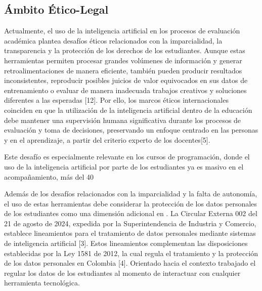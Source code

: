 \documentclass[letterpaper, 10 pt, conference]{ieeeconf}
\begin{document}
    \subsection{Ámbito Ético-Legal} 
    Actualmente, el uso de la inteligencia artificial en los procesos de evaluación académica plantea desafíos éticos relacionados con la imparcialidad, la transparencia y la protección de los derechos de los estudiantes. Aunque estas herramientas permiten procesar grandes volúmenes de información y generar retroalimentaciones de manera eficiente, también pueden producir resultados inconsistentes, reproducir posibles juicios de valor equivocados en sus datos de entrenamiento o evaluar de manera inadecuada trabajos creativos y soluciones diferentes a las esperadas [12]. Por ello, los marcos éticos internacionales coinciden en que la utilización de la inteligencia artificial dentro de la educación debe mantener una supervisión humana significativa durante los procesos de evaluación y toma de decisiones, preservando un enfoque centrado en las personas y en el aprendizaje, a partir del criterio experto de los docentes[5].

    Este desafío es especialmente relevante en los cursos de programación, donde el uso de la inteligencia artificial por parte de los estudiantes ya es masivo en el acompañamiento, más del 40%

    Además de los desafíos relacionados con la imparcialidad y la falta de autonomía, el uso de estas herramientas debe considerar la protección de los datos personales de los estudiantes como una dimensión adicional en . La Circular Externa 002 del 21 de agosto de 2024, expedida por la Superintendencia de Industria y Comercio, establece lineamientos para el tratamiento de datos personales mediante sistemas de inteligencia artificial [3]. Estos lineamientos complementan las disposiciones establecidas por la Ley 1581 de 2012, la cual regula el tratamiento y la protección de los datos personales en Colombia [4]. Orientado hacia el contexto trabajado el regular los datos de los estudiantes al momento de interactuar con cualquier herramienta tecnológica.
\end{document}
